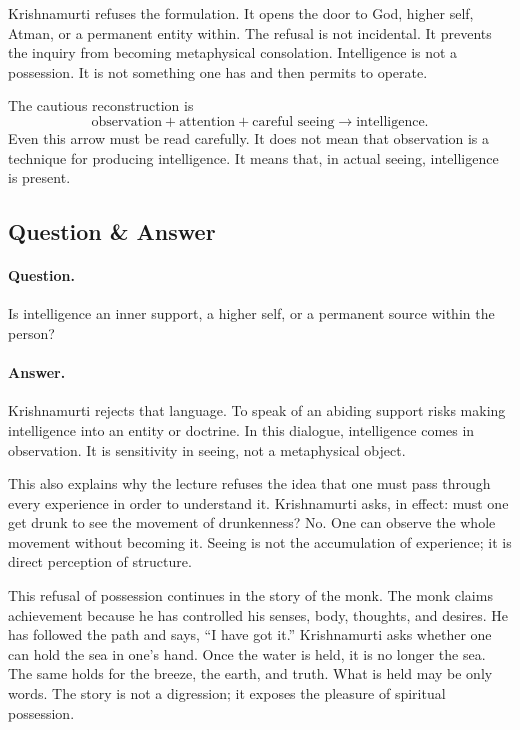 Krishnamurti refuses the formulation. It opens the door to God, higher self, Atman, or a permanent entity within. The refusal is not incidental. It prevents the inquiry from becoming metaphysical consolation. Intelligence is not a possession. It is not something one has and then permits to operate.

The cautious reconstruction is
\begin{equation}
\text{observation} + \text{attention} + \text{careful seeing}
\longrightarrow
\text{intelligence}.
\end{equation}
Even this arrow must be read carefully. It does not mean that observation is a technique for producing intelligence. It means that, in actual seeing, intelligence is present.

\subsection{Question \& Answer}

\paragraph{Question.}
Is intelligence an inner support, a higher self, or a permanent source within the person?

\paragraph{Answer.}
Krishnamurti rejects that language. To speak of an abiding support risks making intelligence into an entity or doctrine. In this dialogue, intelligence comes in observation. It is sensitivity in seeing, not a metaphysical object.

This also explains why the lecture refuses the idea that one must pass through every experience in order to understand it. Krishnamurti asks, in effect: must one get drunk to see the movement of drunkenness? No. One can observe the whole movement without becoming it. Seeing is not the accumulation of experience; it is direct perception of structure.

This refusal of possession continues in the story of the monk. The monk claims achievement because he has controlled his senses, body, thoughts, and desires. He has followed the path and says, ``I have got it.'' Krishnamurti asks whether one can hold the sea in one's hand. Once the water is held, it is no longer the sea. The same holds for the breeze, the earth, and truth. What is held may be only words. The story is not a digression; it exposes the pleasure of spiritual possession.

